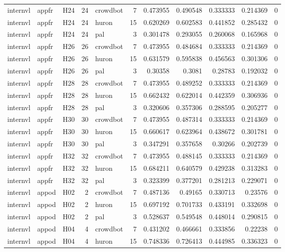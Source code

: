 \begin{longtable}{lllrlrrrrrr}
internvl & appfr & H24 & 24 & crowdbot & 7 & 0.473955 & 0.490548 & 0.333333 & 0.214369 & 0 \\
internvl & appfr & H24 & 24 & huron & 15 & 0.620269 & 0.602583 & 0.441852 & 0.285432 & 0 \\
internvl & appfr & H24 & 24 & pal & 3 & 0.301478 & 0.293055 & 0.260068 & 0.165968 & 0 \\
internvl & appfr & H26 & 26 & crowdbot & 7 & 0.473955 & 0.484684 & 0.333333 & 0.214369 & 0 \\
internvl & appfr & H26 & 26 & huron & 15 & 0.631579 & 0.595838 & 0.456563 & 0.301306 & 0 \\
internvl & appfr & H26 & 26 & pal & 3 & 0.30358 & 0.3081 & 0.28783 & 0.192032 & 0 \\
internvl & appfr & H28 & 28 & crowdbot & 7 & 0.473955 & 0.489252 & 0.333333 & 0.214369 & 0 \\
internvl & appfr & H28 & 28 & huron & 15 & 0.662432 & 0.622014 & 0.442359 & 0.306936 & 0 \\
internvl & appfr & H28 & 28 & pal & 3 & 0.320606 & 0.357306 & 0.288595 & 0.205277 & 0 \\
internvl & appfr & H30 & 30 & crowdbot & 7 & 0.473955 & 0.487314 & 0.333333 & 0.214369 & 0 \\
internvl & appfr & H30 & 30 & huron & 15 & 0.660617 & 0.623964 & 0.438672 & 0.301781 & 0 \\
internvl & appfr & H30 & 30 & pal & 3 & 0.347291 & 0.357658 & 0.30266 & 0.202739 & 0 \\
internvl & appfr & H32 & 32 & crowdbot & 7 & 0.473955 & 0.488145 & 0.333333 & 0.214369 & 0 \\
internvl & appfr & H32 & 32 & huron & 15 & 0.684211 & 0.640579 & 0.429238 & 0.313283 & 0 \\
internvl & appfr & H32 & 32 & pal & 3 & 0.323399 & 0.377201 & 0.281213 & 0.229071 & 0 \\
internvl & appod & H02 & 2 & crowdbot & 7 & 0.487136 & 0.49165 & 0.330713 & 0.23576 & 0 \\
internvl & appod & H02 & 2 & huron & 15 & 0.697192 & 0.701733 & 0.433191 & 0.332698 & 0 \\
internvl & appod & H02 & 2 & pal & 3 & 0.528637 & 0.549548 & 0.448014 & 0.290815 & 0 \\
internvl & appod & H04 & 4 & crowdbot & 7 & 0.431202 & 0.466661 & 0.333856 & 0.22238 & 0 \\
internvl & appod & H04 & 4 & huron & 15 & 0.748336 & 0.726413 & 0.444985 & 0.336323 & 0 \\

\end{longtable}
